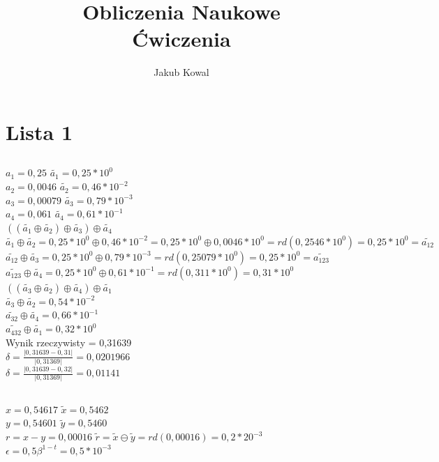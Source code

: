 \documentclass{article}
\title{Obliczenia Naukowe\\Ćwiczenia}
\author{Jakub Kowal}
\date{}
\begin{document}
\maketitle
\renewcommand{\thesubsubsection}{\thesubsection.\alph{subsubsection})}

    \section{Lista 1}
    \subsection{}
    $a_{1}=0,25$    $\tilde{a_{1}} = 0,25 * 10^{0}$\\
    $a_{2}=0,0046$    $\tilde{a_{2}} = 0,46 * 10^{-2}$\\
    $a_{3}=0,00079$    $\tilde{a_{3}} = 0,79 * 10^{-3}$\\
    $a_{4}=0,061$    $\tilde{a_{4}} = 0,61 * 10^{-1}$\\
    $((\tilde{a_{1}}\oplus \tilde{a_{2}})\oplus \tilde{a_{3}})\oplus \tilde{a_{4}}$\\
    $\tilde{a_{1}}\oplus \tilde{a_{2}} = 0,25 * 10^{0}\oplus 0,46 * 10^{-2}=0,25 * 10^{0} \oplus 0,0046 * 10^{0} = rd(0,2546*10^{0})= 0,25 * 10^{0}=\tilde{a_{12}}$\\
    $\tilde{a_{12}}\oplus \tilde{a_{3}} = 0,25 * 10^{0} \oplus 0,79*10^{-3} = rd(0,25079*10^{0}) = 0,25 * 10^{0}= \tilde{a_{123}}$\\
    $\tilde{a_{123}} \oplus \tilde{a_{4}} = 0,25 * 10^{0} \oplus 0,61*10^{-1}=rd(0,311*10^{0})=0,31*10^{0}$\\
    $((\tilde{a_{3}}\oplus \tilde{a_{2}})\oplus \tilde{a_{4}})\oplus \tilde{a_{1}}$\\
    $\tilde{a_{3}}\oplus \tilde{a_{2}} = 0,54*10^{-2}$\\
    $\tilde{a_{32}}\oplus \tilde{a_{4}} = 0,66*10^{-1}$\\
    $\tilde{a_{432}} \oplus \tilde{a_{1}} = 0,32 * 10^{0}$\\
    Wynik rzeczywisty = 0,31639\\
    $\delta = \frac{|0,31639 - 0,31|}{|0,31369|}=0,0201966$\\
    $\delta = \frac{|0,31639 - 0,32|}{|0,31369|}=0,01141$

    \subsection{}
    \subsubsection{}
    $x=0,54617$ $\tilde{x}=0,5462$\\
    $y=0,54601$ $\tilde{y}=0,5460$\\
    $r=x-y=0,00016$ $\tilde{r}=\tilde{x} \ominus \tilde{y}=rd(0,00016)=0,2*20^{-3}$\\
    $\epsilon = 0,5 \beta^{1-t}=0,5 * 10^{-3}$\\
\end{document}

